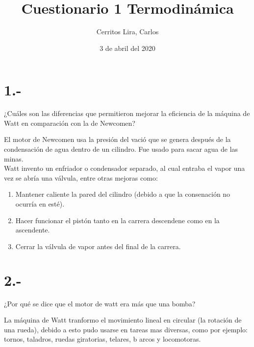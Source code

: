 \documentclass{article}
\title{Cuestionario 1 Termodinámica}
\author{Cerritos Lira, Carlos}
\date{3 de abril del 2020}
\begin{document}
\maketitle
\section*{1.-}
¿Cuáles son las diferencias que permitieron mejorar la eficiencia de la máquina de Watt en 
comparación con la de Newcomen?
\begin{tcolorbox}[breakable]
    El motor de Newcomen usa la presión del vació que se genera después de la condensación 
    de agua dentro de un cilindro. Fue usado para sacar agua de las minas. \\
    Watt invento un enfriador o condensador separado, al cual entraba el vapor una vez se abría 
    una válvula, entre otras mejoras como:
    \begin{enumerate}
        \item Mantener caliente la pared del cilindro (debido a que la consenación no ocurría en esté).
        \item Hacer funcionar el pistón tanto en la carrera descendene como en la ascendente.
        \item Cerrar la válvula de vapor antes del final de la carrera.
    \end{enumerate}
    \end{tcolorbox}

\section*{2.-}
¿Por qué se dice que el motor de watt era más que una bomba?
\begin{tcolorbox}[breakable]
    La máquina de Watt tranformo el movimiento lineal en circular (la rotación de una rueda),
    debido a esto pudo usarse en tareas mas diversas, como por ejemplo: tornos, taladros, 
    ruedas giratorias, telares, b arcos y locomotoras.
\end{tcolorbox}
\end{document}

